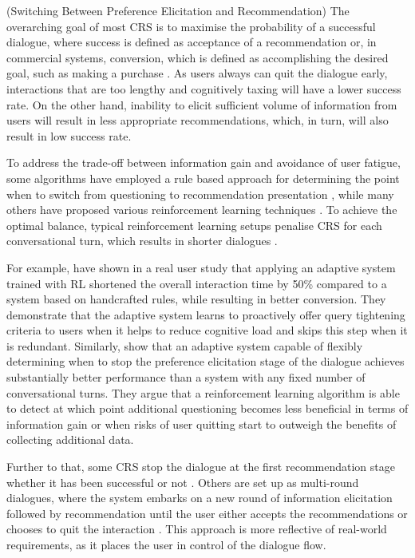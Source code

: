 \subsubsetion(Switching Between Preference Elicitation and Recommendation)
The overarching goal of most CRS is to maximise the probability of a successful dialogue, where success is defined as acceptance of a recommendation \citep{vendrov2020gradient, lei2020estimation, li2021seamlessly} or, in commercial systems, conversion, which is defined as accomplishing the desired goal, such as making a purchase \citep{mahmood2008adaptive, mahmood2009improving, mahmood2009learning}. As users always can quit the dialogue early, interactions that are too lengthy and cognitively taxing will have a lower success rate. On the other hand, inability to elicit sufficient volume of information from users will result in less appropriate recommendations, which, in turn, will also result in low success rate.  

To address the trade-off between information gain and avoidance of user fatigue, some algorithms have employed a rule based approach for determining the point when to switch from questioning to recommendation presentation \citep{christakopoulou2016towards}, while many others have proposed various reinforcement learning techniques \citep{mahmood2009learning, greco2017converse, sun2018conversational, tsumita2019dialogue, vendrov2020gradient, lei2020estimation,  li2021seamlessly}. To achieve the optimal balance, typical reinforcement learning setups penalise CRS for each conversational turn, which results in shorter dialogues \citep{tsumita2019dialogue, lei2020estimation}.

For example, \citep{mahmood2009improving, mahmood2009learning} have shown in a real user study that applying an adaptive system trained with RL shortened the overall interaction time by 50\% compared to a system based on handcrafted rules, while resulting in better conversion. They demonstrate that the adaptive system learns to proactively offer query tightening criteria to users when it helps to reduce cognitive load and skips this step when it is redundant. Similarly, \citep{sun2018conversational} show that an adaptive system capable of flexibly determining when to stop the preference elicitation stage of the dialogue achieves substantially better performance than a system with any fixed number of conversational turns. They argue that a reinforcement learning algorithm is able to detect at which point additional questioning becomes less beneficial in terms of information gain or when risks of user quitting start to outweigh the benefits of collecting additional data.

Further to that, some CRS stop the dialogue at the first recommendation stage whether it has been successful or not \citep{sun2018conversational}. Others are set up as multi-round dialogues, where the system embarks on a new round of information elicitation followed by recommendation until the user either accepts the recommendations or chooses to quit the interaction \citep{lei2020estimation, li2021seamlessly}. This approach is more reflective of real-world requirements, as it places the user in control of the dialogue flow.

